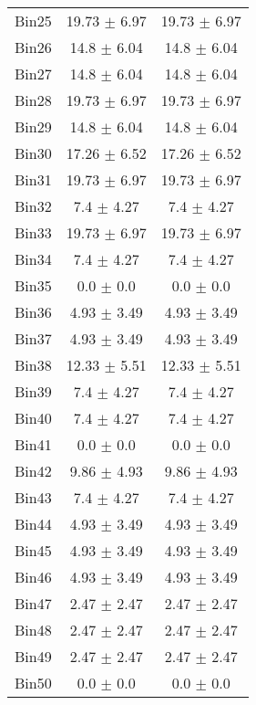 \begin{tabular}{|c|c|c|}
     Bin25 & 19.73 $\pm$ 6.97 & 19.73 $\pm$ 6.97 \\ \cline{1-3} 
     Bin26 & 14.8 $\pm$ 6.04 & 14.8 $\pm$ 6.04 \\ \cline{1-3} 
     Bin27 & 14.8 $\pm$ 6.04 & 14.8 $\pm$ 6.04 \\ \cline{1-3} 
     Bin28 & 19.73 $\pm$ 6.97 & 19.73 $\pm$ 6.97 \\ \cline{1-3} 
     Bin29 & 14.8 $\pm$ 6.04 & 14.8 $\pm$ 6.04 \\ \cline{1-3} 
     Bin30 & 17.26 $\pm$ 6.52 & 17.26 $\pm$ 6.52 \\ \cline{1-3} 
     Bin31 & 19.73 $\pm$ 6.97 & 19.73 $\pm$ 6.97 \\ \cline{1-3} 
     Bin32 & 7.4 $\pm$ 4.27 & 7.4 $\pm$ 4.27 \\ \cline{1-3} 
     Bin33 & 19.73 $\pm$ 6.97 & 19.73 $\pm$ 6.97 \\ \cline{1-3} 
     Bin34 & 7.4 $\pm$ 4.27 & 7.4 $\pm$ 4.27 \\ \cline{1-3} 
     Bin35 & 0.0 $\pm$ 0.0 & 0.0 $\pm$ 0.0 \\ \cline{1-3} 
     Bin36 & 4.93 $\pm$ 3.49 & 4.93 $\pm$ 3.49 \\ \cline{1-3} 
     Bin37 & 4.93 $\pm$ 3.49 & 4.93 $\pm$ 3.49 \\ \cline{1-3} 
     Bin38 & 12.33 $\pm$ 5.51 & 12.33 $\pm$ 5.51 \\ \cline{1-3} 
     Bin39 & 7.4 $\pm$ 4.27 & 7.4 $\pm$ 4.27 \\ \cline{1-3} 
     Bin40 & 7.4 $\pm$ 4.27 & 7.4 $\pm$ 4.27 \\ \cline{1-3} 
     Bin41 & 0.0 $\pm$ 0.0 & 0.0 $\pm$ 0.0 \\ \cline{1-3} 
     Bin42 & 9.86 $\pm$ 4.93 & 9.86 $\pm$ 4.93 \\ \cline{1-3} 
     Bin43 & 7.4 $\pm$ 4.27 & 7.4 $\pm$ 4.27 \\ \cline{1-3} 
     Bin44 & 4.93 $\pm$ 3.49 & 4.93 $\pm$ 3.49 \\ \cline{1-3} 
     Bin45 & 4.93 $\pm$ 3.49 & 4.93 $\pm$ 3.49 \\ \cline{1-3} 
     Bin46 & 4.93 $\pm$ 3.49 & 4.93 $\pm$ 3.49 \\ \cline{1-3} 
     Bin47 & 2.47 $\pm$ 2.47 & 2.47 $\pm$ 2.47 \\ \cline{1-3} 
     Bin48 & 2.47 $\pm$ 2.47 & 2.47 $\pm$ 2.47 \\ \cline{1-3} 
     Bin49 & 2.47 $\pm$ 2.47 & 2.47 $\pm$ 2.47 \\ \cline{1-3} 
     Bin50 & 0.0 $\pm$ 0.0 & 0.0 $\pm$ 0.0 \\ \cline{1-3} 

\end{tabular}

